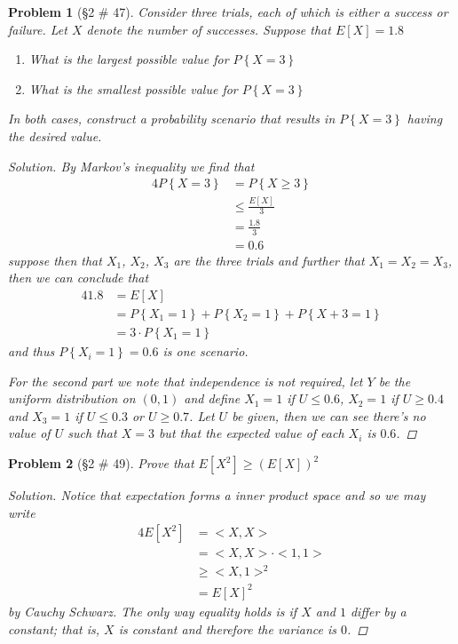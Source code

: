 \documentclass[11pt, oneside]{book}   	%
\newtheorem{problem}{Problem}[chapter]
\newcommand{\set}[1]{\left\{#1\right\}}
\begin{document}
\begin{problem}[\S 2 \# 47]
	Consider three trials, each of which is either a success or failure. Let $X$ denote the number of successes. Suppose that $E[X]=1.8$
	\begin{enumerate}
		\item What is the largest possible value for $P\set{X=3}$
		\item What is the smallest possible value for $P\set{X=3}$
	\end{enumerate}
	In both cases, construct a probability scenario that results in $P\set{X=3}$ having the desired value. 
	\begin{proof}[Solution]
		By Markov's inequality we find that 
		\begin{alignat}{4}
			P\set{X=3}&=P\set{X\geq 3} \\
				&\leq \frac{E[X]}{3} \\
				&=\frac{1.8}{3} \\
				&=0.6
		\end{alignat}
		suppose then that $X_1$, $X_2$, $X_3$ are the three trials and further that $X_1=X_2=X_3$, then we can conclude that 
		\begin{alignat}{4}
			1.8&=E[X] \\
				&=P\set{X_1=1}+P\set{X_2=1}+P\set{X+3=1} \\
				&=3\cdot P\set{X_1=1}
		\end{alignat}
		and thus $P\set{X_i=1}=0.6$ is one scenario. 
		
		For the second part we note that independence is not required, let $Y$ be the uniform distribution on $(0, 1)$ and define $X_1=1$ if $U\leq 0.6$, $X_2=1$ if $U\geq 0.4$ and $X_3=1$ if $U\leq 0.3$ or $U\geq 0.7$. Let $U$ be given, then we can see there's no value of $U$ such that $X=3$ but that the expected value of each $X_i$ is $0.6$. 

	\end{proof}
\end{problem}

\begin{problem}[\S 2 \# 49]
	Prove that $E\left[X^2\right]\geq \left(E[X]\right)^2$
	\begin{proof}[Solution]
		Notice that expectation forms a inner product space and so we may write 
		\begin{alignat}{4}
			E[X^2]&=<X, X> \\
				&=<X, X>\cdot<1, 1> \\
				&\geq <X, 1>^2 \\
				&=E[X]^2
		\end{alignat}
		by Cauchy Schwarz. The only way equality holds is if $X$ and $1$ differ by a constant; that is, $X$ is constant and therefore the variance is $0$. 
	\end{proof}
\end{problem}
\end{document}
